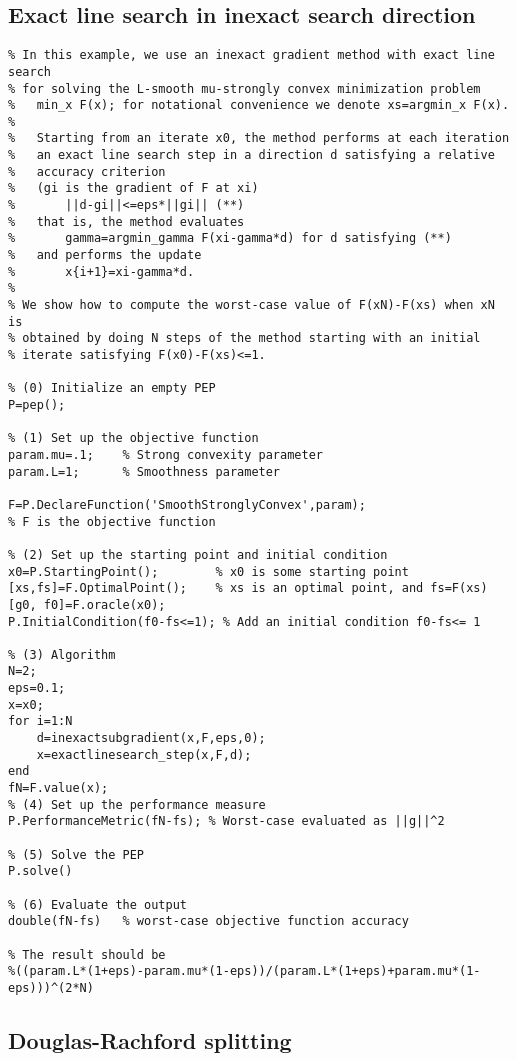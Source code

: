 \documentclass[11pt,a4paper]{article}
\begin{document}
\subsection{Exact line search in inexact search direction}\label{ex:inexactLS}
\begin{lstlisting}
% In this example, we use an inexact gradient method with exact line search
% for solving the L-smooth mu-strongly convex minimization problem
%   min_x F(x); for notational convenience we denote xs=argmin_x F(x).
%
%   Starting from an iterate x0, the method performs at each iteration
%   an exact line search step in a direction d satisfying a relative 
%   accuracy criterion
%   (gi is the gradient of F at xi)
%       ||d-gi||<=eps*||gi|| (**)
%   that is, the method evaluates
%       gamma=argmin_gamma F(xi-gamma*d) for d satisfying (**)
%   and performs the update
%       x{i+1}=xi-gamma*d.
%
% We show how to compute the worst-case value of F(xN)-F(xs) when xN is
% obtained by doing N steps of the method starting with an initial
% iterate satisfying F(x0)-F(xs)<=1.

% (0) Initialize an empty PEP
P=pep();

% (1) Set up the objective function
param.mu=.1;	% Strong convexity parameter
param.L=1;      % Smoothness parameter

F=P.DeclareFunction('SmoothStronglyConvex',param); 
% F is the objective function

% (2) Set up the starting point and initial condition
x0=P.StartingPoint();		 % x0 is some starting point
[xs,fs]=F.OptimalPoint(); 	 % xs is an optimal point, and fs=F(xs)
[g0, f0]=F.oracle(x0);               
P.InitialCondition(f0-fs<=1); % Add an initial condition f0-fs<= 1

% (3) Algorithm
N=2;
eps=0.1;
x=x0;
for i=1:N
    d=inexactsubgradient(x,F,eps,0);
    x=exactlinesearch_step(x,F,d);
end
fN=F.value(x);
% (4) Set up the performance measure
P.PerformanceMetric(fN-fs); % Worst-case evaluated as ||g||^2

% (5) Solve the PEP
P.solve()

% (6) Evaluate the output
double(fN-fs)   % worst-case objective function accuracy

% The result should be
%((param.L*(1+eps)-param.mu*(1-eps))/(param.L*(1+eps)+param.mu*(1-eps)))^(2*N)
\end{lstlisting}
\newpage
\subsection{Douglas-Rachford splitting}
\end{document}
